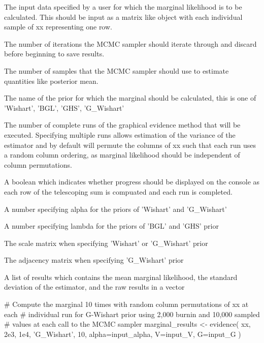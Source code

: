 \documentclass[a4paper]{book}
\begin{document}
\begin{Arguments}
\begin{ldescription}
\item[\code{xx}] The input data specified by a user for which the marginal 
likelihood is to be calculated. This should be input as a matrix like object
with each individual sample of xx representing one row.

\item[\code{burnin}] The number of iterations the MCMC sampler should iterate 
through and discard before beginning to save results.

\item[\code{nmc}] The number of samples that the MCMC sampler should use to estimate
quantities like posterior mean.

\item[\code{prior\_name}] The name of the prior for which the marginal should be 
calculated, this is one of 'Wishart', 'BGL', 'GHS', 'G\_Wishart'

\item[\code{runs}] The number of complete runs of the graphical evidence method that
will be executed. Specifying multiple runs allows estimation of the variance
of the estimator and by default will permute the columns of xx such that 
each run uses a random column ordering, as marginal likelihood should be 
independent of column permutations.

\item[\code{print\_progress}] A boolean which indicates whether progress should be 
displayed on the console as each row of the telescoping sum is compuated and
each run is completed.

\item[\code{alpha}] A number specifying alpha for the priors of 'Wishart' and 
'G\_Wishart'

\item[\code{lambda}] A number specifying lambda for the priors of 'BGL' and 'GHS'
prior

\item[\code{V}] The scale matrix when specifying 'Wishart' or 'G\_Wishart' prior

\item[\code{G}] The adjacency matrix when specifying 'G\_Wishart' prior
\end{ldescription}
\end{Arguments}
%
\begin{Value}
A list of results which contains the mean marginal likelihood, the
standard deviation of the estimator, and the raw results in a vector
\end{Value}
%
\begin{Examples}
\begin{ExampleCode}
# Compute the marginal 10 times with random column permutations of xx at each
# individual run for G-Wishart prior using 2,000 burnin and 10,000 sampled
# values at each call to the MCMC sampler
marginal_results <- evidence(
  xx, 2e3, 1e4, 'G_Wishart', 10, alpha=input_alpha, V=input_V, G=input_G
)
\end{ExampleCode}
\end{Examples}
\printindex{}
\end{document}

